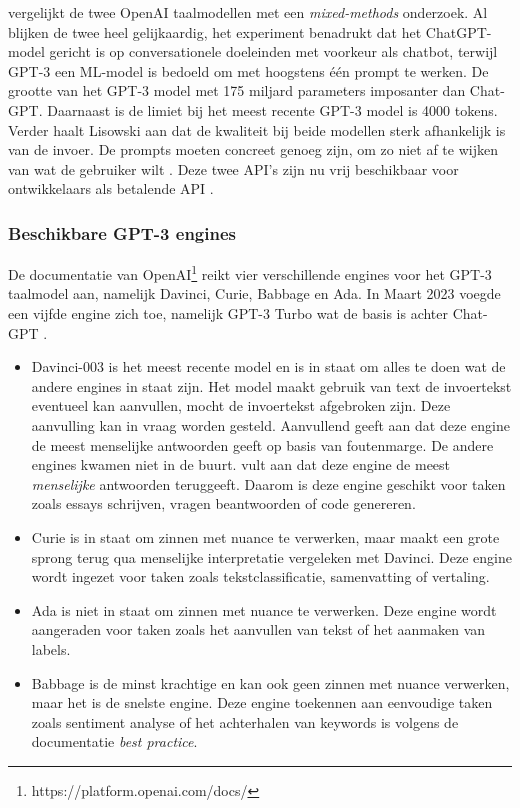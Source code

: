 \textcite{Lisowski2023} vergelijkt de twee OpenAI taalmodellen met een \textit{mixed-methods} onderzoek. Al blijken de twee heel gelijkaardig, het experiment benadrukt dat het ChatGPT-model gericht is op conversationele doeleinden met voorkeur als chatbot, terwijl GPT-3 een ML-model is bedoeld om met hoogstens één prompt te werken. De grootte van het GPT-3 model met 175 miljard parameters imposanter dan Chat-GPT. Daarnaast is de limiet bij het meest recente GPT-3 model is 4000 tokens. Verder haalt Lisowski aan dat de kwaliteit bij beide modellen sterk afhankelijk is van de invoer. De prompts moeten concreet genoeg zijn, om zo niet af te wijken van wat de gebruiker wilt \autocite{Lisowski2023}. Deze twee API's zijn nu vrij beschikbaar voor ontwikkelaars als betalende API \autocite{Brockman2023}.

\subsubsection{Beschikbare GPT-3 engines}

De documentatie van OpenAI\footnote{https://platform.openai.com/docs/} reikt vier verschillende engines voor het GPT-3 taalmodel aan, namelijk Davinci, Curie, Babbage en Ada. In Maart 2023 voegde een vijfde engine zich toe, namelijk GPT-3 Turbo wat de basis is achter Chat-GPT \autocite{Brockman2023}.

\begin{itemize}
	\item Davinci-003 is het meest recente model en is in staat om alles te doen wat de andere engines in staat zijn. Het model maakt gebruik van text de invoertekst eventueel kan aanvullen, mocht de invoertekst afgebroken zijn. Deze aanvulling kan in vraag worden gesteld. Aanvullend geeft aan dat deze engine de meest menselijke antwoorden geeft op basis van foutenmarge. De andere engines kwamen niet in de buurt. \textcite{Binz2023} vult aan dat deze engine de meest \textit{menselijke} antwoorden teruggeeft. Daarom is deze engine geschikt voor taken zoals essays schrijven, vragen beantwoorden of code genereren.
	\item Curie is in staat om zinnen met nuance te verwerken, maar maakt een grote sprong terug qua menselijke interpretatie vergeleken met Davinci. Deze engine wordt ingezet voor taken zoals tekstclassificatie, samenvatting of vertaling.
	\item Ada is niet in staat om zinnen met nuance te verwerken. Deze engine wordt aangeraden voor taken zoals het aanvullen van tekst of het aanmaken van labels.
	\item Babbage is de minst krachtige en kan ook geen zinnen met nuance verwerken, maar het is de snelste engine. Deze engine toekennen aan eenvoudige taken zoals sentiment analyse of het achterhalen van keywords is volgens de documentatie \textit{best practice}.
\end{itemize} 


